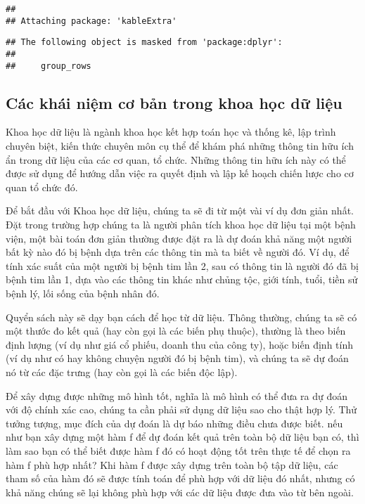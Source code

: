 \documentclass[
]{article}
\begin{document}
\begin{verbatim}
## 
## Attaching package: 'kableExtra'
\end{verbatim}

\begin{verbatim}
## The following object is masked from 'package:dplyr':
## 
##     group_rows
\end{verbatim}

\hypertarget{cuxe1c-khuxe1i-niux1ec7m-cux1a1-bux1ea3n-trong-khoa-hux1ecdc-dux1eef-liux1ec7u}{%
\subsection{Các khái niệm cơ bản trong khoa học dữ liệu}\label{cuxe1c-khuxe1i-niux1ec7m-cux1a1-bux1ea3n-trong-khoa-hux1ecdc-dux1eef-liux1ec7u}}

Khoa học dữ liệu là ngành khoa học kết hợp toán học và thống kê, lập trình chuyên biệt, kiến thức chuyên môn cụ thể để khám phá những thông tin hữu ích ẩn trong dữ liệu của các cơ quan, tổ chức. Những thông tin hữu ích này có thể được sử dụng để hướng dẫn việc ra quyết định và lập kế hoạch chiến lược cho cơ quan tổ chức đó.

Để bắt đầu với Khoa học dữ liệu, chúng ta sẽ đi từ một vài ví dụ đơn giản nhất. Đặt trong trường hợp chúng ta là người phân tích khoa học dữ liệu tại một bệnh viện, một bài toán đơn giản thường được đặt ra là dự đoán khả năng một người bất kỳ nào đó bị bệnh dựa trên các thông tin mà ta biết về người đó. Ví dụ, để tính xác suất của một người bị bệnh tim lần 2, sau có thông tin là người đó đã bị bệnh tim lần 1, dựa vào các thông tin khác như chủng tộc, giới tính, tuổi, tiền sử bệnh lý, lối sống của bệnh nhân đó.

Quyển sách này sẽ dạy bạn cách để học từ dữ liệu. Thông thường, chúng ta sẽ có một thước đo kết quả (hay còn gọi là các biến phụ thuộc), thường là theo biến định lượng (ví dụ như giá cổ phiếu, doanh thu của công ty), hoặc biến định tính (ví dụ như có hay không chuyện người đó bị bệnh tim), và chúng ta sẽ dự đoán nó từ các đặc trưng (hay còn gọi là các biến độc lập).

Để xây dựng được những mô hình tốt, nghĩa là mô hình có thể đưa ra dự đoán với độ chính xác cao, chúng ta cần phải sử dụng dữ liệu sao cho thật hợp lý. Thử tưởng tượng, mục đích của dự đoán là dự báo những điều chưa được biết. nếu như bạn xây dựng một hàm f để dự đoán kết quả trên toàn bộ dữ liệu bạn có, thì làm sao bạn có thể biết được hàm f đó có hoạt động tốt trên thực tế để chọn ra hàm f phù hợp nhất? Khi hàm f được xây dựng trên toàn bộ tập dữ liệu, các tham số của hàm đó sẽ được tính toán để phù hợp với dữ liệu đó nhất, nhưng có khả năng chúng sẽ lại không phù hợp với các dữ liệu được đưa vào từ bên ngoài.
\end{document}
